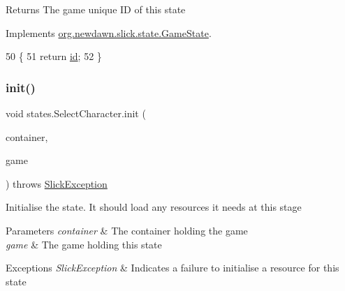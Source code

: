 \begin{DoxyReturn}{Returns}
The game unique ID of this state 
\end{DoxyReturn}


Implements \mbox{\hyperlink{interfaceorg_1_1newdawn_1_1slick_1_1state_1_1_game_state_a54f2bc6a91feaf0614a5ef19f1d03313}{org.\+newdawn.\+slick.\+state.\+Game\+State}}.


\begin{DoxyCode}
50                        \{
51         \textcolor{keywordflow}{return} \mbox{\hyperlink{classstates_1_1_select_character_a5c1f6e40502826b9d1b8ece9e66f08a5}{id}};
52     \}
\end{DoxyCode}
\mbox{\label{classstates_1_1_select_character_af65a8be402fe3506397f096d75a8adf2}} 
\subsubsection{\texorpdfstring{init()}{init()}}
{\footnotesize\ttfamily void states.\+Select\+Character.\+init (\begin{DoxyParamCaption}\item[{final \mbox{\hyperlink{classorg_1_1newdawn_1_1slick_1_1_game_container}{Game\+Container}}}]{container,  }\item[{final \mbox{\hyperlink{classorg_1_1newdawn_1_1slick_1_1state_1_1_state_based_game}{State\+Based\+Game}}}]{game }\end{DoxyParamCaption}) throws \mbox{\hyperlink{classorg_1_1newdawn_1_1slick_1_1_slick_exception}{Slick\+Exception}}\hspace{0.3cm}{\ttfamily [inline]}}

Initialise the state. It should load any resources it needs at this stage


\begin{DoxyParams}{Parameters}
{\em container} & The container holding the game \\
\hline
{\em game} & The game holding this state \\
\hline
\end{DoxyParams}

\begin{DoxyExceptions}{Exceptions}
{\em Slick\+Exception} & Indicates a failure to initialise a resource for this state \\
\hline
\end{DoxyExceptions}


